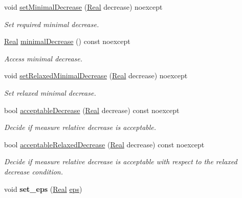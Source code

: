 \begin{DoxyCompactItemize}
\item 
void \hyperlink{classSpacy_1_1Mixin_1_1DecreaseCondition_aabc5e2473edace0c87da7fbd9fa0ae61}{set\-Minimal\-Decrease} (\hyperlink{classSpacy_1_1Real}{Real} decrease) noexcept
\begin{DoxyCompactList}\small\item\em Set required minimal decrease. \end{DoxyCompactList}\item 
\hyperlink{classSpacy_1_1Real}{Real} \hyperlink{classSpacy_1_1Mixin_1_1DecreaseCondition_aeeda8b1d9f177fe5dd532e42de09ab44}{minimal\-Decrease} () const noexcept
\begin{DoxyCompactList}\small\item\em Access minimal decrease. \end{DoxyCompactList}\item 
void \hyperlink{classSpacy_1_1Mixin_1_1DecreaseCondition_a86d6a8c8fc683c31572fd818a102a362}{set\-Relaxed\-Minimal\-Decrease} (\hyperlink{classSpacy_1_1Real}{Real} decrease) noexcept
\begin{DoxyCompactList}\small\item\em Set relaxed minimal decrease. \end{DoxyCompactList}\item 
bool \hyperlink{classSpacy_1_1Mixin_1_1DecreaseCondition_a69c0c90daf14fc40461876f71c49ffc2}{acceptable\-Decrease} (\hyperlink{classSpacy_1_1Real}{Real} decrease) const noexcept
\begin{DoxyCompactList}\small\item\em Decide if measure relative decrease is acceptable. \end{DoxyCompactList}\item 
bool \hyperlink{classSpacy_1_1Mixin_1_1DecreaseCondition_a5ffb5bc008544db96d935a0ca34dcd24}{acceptable\-Relaxed\-Decrease} (\hyperlink{classSpacy_1_1Real}{Real} decrease) const noexcept
\begin{DoxyCompactList}\small\item\em Decide if measure relative decrease is acceptable with respect to the relaxed decrease condition. \end{DoxyCompactList}\item 
\hypertarget{classSpacy_1_1Mixin_1_1Eps_a818ab6dfab5e4eea583e1302bcc621f8}{void {\bfseries set\-\_\-eps} (\hyperlink{classSpacy_1_1Real}{Real} \hyperlink{classSpacy_1_1Mixin_1_1Eps_a812b99b0abc1d78a34b4114907f23f52}{eps})}\label{classSpacy_1_1Mixin_1_1Eps_a818ab6dfab5e4eea583e1302bcc621f8}


\end{DoxyCompactItemize}
